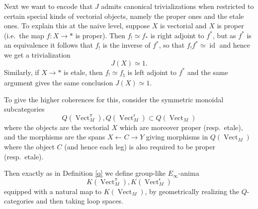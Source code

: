 \documentclass[12pt]{article}
\newcommand{\on}{\operatorname}
\begin{document}
Next we want to encode that $J$ admits canonical trivializations when restricted to certain special kinds of vectorial objects, namely the proper ones and the etale ones.  To explain this at the naive level, suppose $X$ is vectorial and $X$ is proper (i.e.\ the map $f:X\to \ast$ is proper).  Then $f_!\simeq f_\ast$ is right adjoint to $f^\ast$, but as $f^\ast$ is an equivalence it follows that $f_!$ is the inverse of $f^\ast$, so that $f_!f^\ast \simeq \on{id}$ and hence we get a trivialization
$$J(X)\simeq 1.$$
Similarly, if $X\to \ast$ is etale, then $f_!\simeq f_\natural$ is left adjoint to $f^\ast$ and the same argument gives the same conclusion $J(X)\simeq 1$. 

To give the higher coherences for this, consider the symmetric monoidal subcategories
$$Q(\on{Vect}^\pi_M),Q(\on{Vect}^\epsilon_M)\subset Q(\on{Vect}_M)$$
where the objects are the vectorial $X$ which are moreover proper (resp.\ etale), and the morphisms are the spans $X\leftarrow C\to Y$ giving morphisms in $Q(\on{Vect}_M)$ where the object $C$ (and hence each leg) is also required to be proper (resp.\ etale).

Then exactly as in Definition \ref{q} we define group-like $E_\infty$-anima
$$K(\on{Vect}^\pi_M), K(\on{Vect}^\epsilon_M)$$
equipped with a natural map to $K(\on{Vect}_M)$, by geometrically realizing the $Q$-categories and then taking loop spaces.
\end{document}
